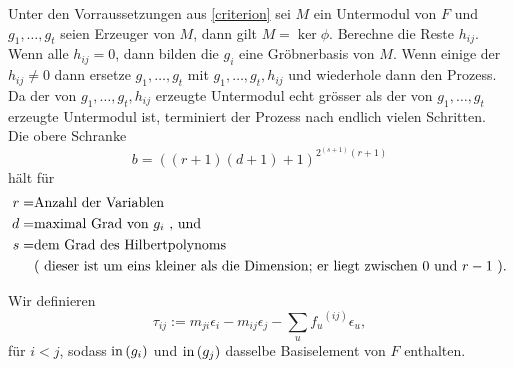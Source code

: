 \documentclass{article}
\begin{document}
	\begin{algo}
		Unter den Vorraussetzungen aus \ref{criterion} 
		sei
		\( M \)
		ein Untermodul von
		\( F \)
		und 
		\( g_{1},\dots,g_{t}\)
		seien  Erzeuger von 
		\( M \), 
		dann gilt
		\( M = \ker \phi .\)
		Berechne die Reste
		\( h_{ij} \).
		Wenn alle 
		\( h_{ij} = 0 \),
		dann bilden die 
		\(g_{i} \)
		eine Gr\"obnerbasis von 
		\( M \).
		Wenn einige der 
		\( h_{ij} \neq 0 \)
		dann ersetze 
		\( g_{1},\dots,g_{t}\)
		mit 
		\( g_{1},\dots,g_{t},h_{ij} \)
		und wiederhole dann den Prozess.
		Da der von
		\( g_{1},\dots,g_{t},h_{ij} \)
		erzeugte Untermodul echt gr\"osser als der von
		\( g_{1},\dots,g_{t}\)
		erzeugte Untermodul ist, 
		terminiert der Prozess nach endlich vielen Schritten. \\
		Die obere Schranke 
		\[
			b=\left( 
				\left( r+1 \right)
				\left( d+1 \right)+1 
			\right)^{2^{(s+1)}(r+1) }
		\]	
		h\"alt f\"ur
		\begin{align*}	
			r = &\text{Anzahl der Variablen} \\
			d = &\text{maximal Grad von \( g_i\) , und  } \\
			s = &\text{dem Grad des Hilbertpolynoms} \\
			    &\text{(  dieser ist um eins kleiner als die Dimension;
			    er liegt zwischen \( 0 \) und \(r-1\) ).}
		\end{align*}

	\end{algo}
	
	\begin{defn}
		Wir definieren
		\[
			\tau_{ij}:=
			m_{ji}\epsilon_{i} - 
			m_{ij} \epsilon_{j} - 
			\sum_{u} {f_{u}}^{\left( ij \right) } 
			\epsilon_{u} 
		,\]
		f\"ur
		\( i < j \),
		sodass 
		\( \operatorname{in} \left( g_{i}  \right) \)
		und
		\( \operatorname{in} \left( g_{j}  \right) \)
		dasselbe Basiselement von \( F \)
		enthalten.
	\end{defn}
\end{document}
